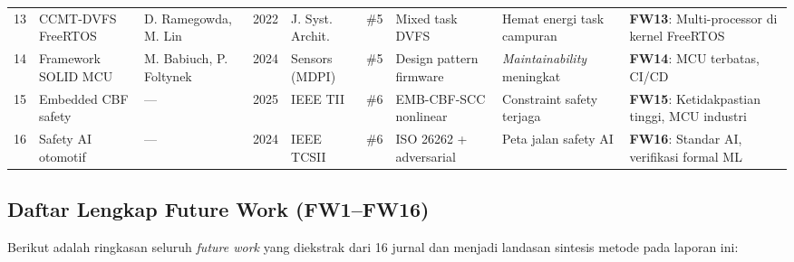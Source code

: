\documentclass[12pt,a4paper]{article}
\begin{document}
\begin{landscape}
\begin{longtable}{@{}p{0.4cm}p{3.2cm}p{1.8cm}p{0.7cm}p{2.2cm}p{0.9cm}p{2.5cm}p{2.8cm}p{3.5cm}@{}}
13 & CCMT-DVFS FreeRTOS & D. Ramegowda, M. Lin & 2022 & J. Syst. Archit. & \#5 & Mixed task DVFS & Hemat energi task campuran & \textbf{FW13}: Multi-processor di kernel FreeRTOS \\
14 & Framework SOLID MCU & M. Babiuch, P. Foltynek & 2024 & Sensors (MDPI) & \#5 & Design pattern firmware & \textit{Maintainability} meningkat & \textbf{FW14}: MCU terbatas, CI/CD \\
15 & Embedded CBF safety & --- & 2025 & IEEE TII & \#6 & EMB-CBF-SCC nonlinear & Constraint safety terjaga & \textbf{FW15}: Ketidakpastian tinggi, MCU industri \\
16 & Safety AI otomotif & --- & 2024 & IEEE TCSII & \#6 & ISO 26262 + adversarial & Peta jalan safety AI & \textbf{FW16}: Standar AI, verifikasi formal ML \\

\end{longtable}
\end{landscape}

\subsection{Daftar Lengkap Future Work (FW1--FW16)}

Berikut adalah ringkasan seluruh \textit{future work} yang diekstrak dari 16 jurnal dan menjadi landasan sintesis metode pada laporan ini:
\end{document}
